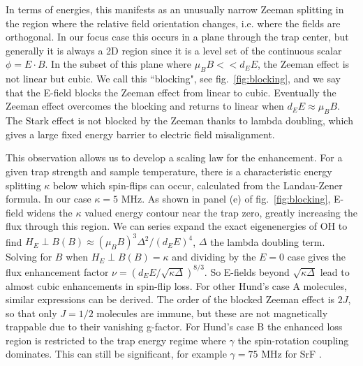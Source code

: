 \documentclass[%
 reprint,
groupedaddress,
 amsmath,amssymb,
 aps,
prl,
]{revtex4-1}
\newcommand{\epb}{$E\!\perp\!B$}
\newcommand{\epbm}{E\!\perp\!B}
\begin{document}
In terms of energies, this manifests as an unusually narrow Zeeman splitting in the region where the relative field orientation changes, i.e. where the fields are orthogonal. In our focus case this occurs in a plane through the trap center, but generally it is always a 2D region since it is a level set of the continuous scalar $\phi = E\cdot B$. In the subset of this plane where $\mu_BB<<d_EE$, the Zeeman effect is not linear but cubic. We call this ``blocking", see fig.~\ref{fig:blocking}, and we say that the E-field blocks the Zeeman effect from linear to cubic. Eventually the Zeeman effect overcomes the blocking and returns to linear when $d_EE\approx\mu_BB$. The Stark effect is not blocked by the Zeeman thanks to lambda doubling, which gives a large fixed energy barrier to electric field misalignment.

This observation allows us to develop a scaling law for the enhancement. For a given trap strength and sample temperature, there is a characteristic energy splitting $\kappa$ below which spin-flips can occur, calculated from the Landau-Zener formula. In our case $\kappa=5\text{ MHz}$. As shown in panel (e) of fig.~\ref{fig:blocking}, E-field widens the $\kappa$ valued energy contour near the trap zero, greatly increasing the flux through this region. We can series expand the exact eigenenergies of OH to find $H_\epbm(B)\approx (\mu_BB)^3\Delta^2/(d_EE)^4$, $\Delta$ the lambda doubling term. Solving for $B$ when $H_\epbm(B)=\kappa$ and dividing by the $E=0$ case gives the flux enhancement factor $\nu = (d_EE/\sqrt{\kappa\Delta})^{8/3}$. So E-fields beyond $\sqrt{\kappa\Delta}$ lead to almost cubic enhancements in spin-flip loss. For other Hund's case A molecules, similar expressions can be derived. The order of the blocked Zeeman effect is $2J$, so that only $J=1/2$ molecules are immune, but these are not magnetically trappable due to their vanishing g-factor. For Hund's case B the enhanced loss region is restricted to the trap energy regime where $\gamma$ the spin-rotation coupling dominates. This can still be significant, for example $\gamma=75\text{ MHz}$ for SrF \cite{Quemener2016}. 


\end{document}
